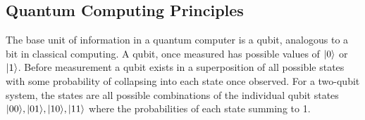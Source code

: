 \subsection{Quantum Computing Principles}
\label{sec:fengPrinciples}
The base unit of information in a quantum computer is a qubit, analogous to a bit in classical computing.
A qubit, once measured has possible values of $\lvert0\rangle$ or $\lvert1\rangle$.
Before measurement a qubit exists in a superposition of all possible states with some probability of collapsing into each state once observed.
For a two-qubit system, the states are all possible combinations of the individual qubit states $\lvert00\rangle, \lvert01\rangle, \lvert10\rangle, \lvert11\rangle$ where the probabilities of each state summing to 1.
\cite{feng_quantum_2023}
